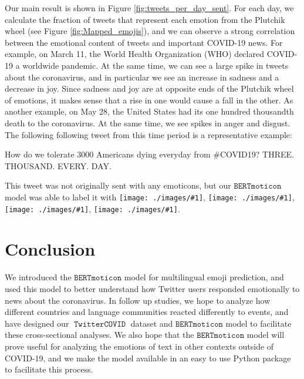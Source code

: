 \documentclass[11pt]{article}
\newcommand{\bertmoji}{\texttt{BERTmoticon}}
\newcommand{\emoji}[1]{\texttt{[image: ./images/\#1]}}
\DeclareMathOperator{\emoticon}{\texttt{TwitterEmoticon}}
\DeclareMathOperator{\corona}{\texttt{TwitterCOVID}}
\begin{document}
Our main result is shown in Figure \ref{fig:tweets_per_day_sent}.
For each day, we calculate the fraction of tweets that represent each emotion from the Plutchik wheel (see Figure \ref{fig:Mapped_emojis}),
and we can observe a strong correlation between the emotional content of tweets and important COVID-19 news.
For example, on March 11, the World Health Organization (WHO) declared COVID-19 a worldwide pandemic.
At the same time, we can see a large spike in tweets about the coronavirus,
and in particular we see an increase in sadness and a decrease in joy.
Since sadness and joy are at opposite ends of the Plutchik wheel of emotions,
it makes sense that a rise in one would cause a fall in the other.
As another example, on May 28, the United States had its one hundred thousandth death to the coronavirus.
At the same time, we see spikes in anger and disgust.
The following following tweet from this time period is a representative example:
\begin{displayquote}
    How do we tolerate 3000 Americans dying everyday from \#COVID19? THREE. THOUSAND. EVERY. DAY.
\end{displayquote}
This tweet was not originally sent with any emoticons,
but our $\bertmoji$ model was able to label it with \emoji{1f620}, \emoji{mask_photo}, \emoji{1f644}, \emoji{1f62d}.


\section{Conclusion}

We introduced the $\bertmoji$ model for multilingual emoji prediction,
and used this model to better understand how Twitter users responded emotionally to news about the coronavirus.
In follow up studies, we hope to analyze how different countries and language communities reacted differently to events,
and have designed our $\corona$ dataset and $\bertmoji$ model to facilitate these cross-sectional analyses.
We also hope that the $\bertmoji$ model will prove useful for analyzing the emotions of text in other contexts outside of COVID-19,
and we make the model available in an easy to use Python package to facilitate this process.
\end{document}
